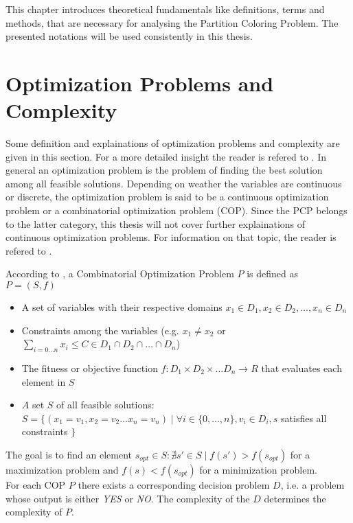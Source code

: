 
This chapter introduces theoretical fundamentals like definitions, terms and methods, that are necessary for analysing the Partition Coloring Problem. The presented notations will be used consistently in this thesis. 

\section{Optimization Problems and Complexity}
Some definition and explainations of optimization problems and complexity are given in this section. For a more detailed insight the reader is refered to \cite{lawler-01,papadimitriou-94,garey-79}. In general an optimization problem is the problem of finding the best solution among all feasible solutions. Depending on weather the variables are continuous or discrete, the optimization problem is said to be a continuous optimization problem or a combinatorial optimization problem (COP). Since the PCP belongs to the latter category, this thesis will not cover further explainations of continuous optimization problems. For information on that topic, the reader is refered to \cite{pardalos-02}.

\begin{definition}
According to \cite{gebhard-12}, a Combinatorial Optimization Problem $P$ is defined as $P = (S, f)$
\begin{itemize}
\item A set of variables with their respective domains $x_1 \in D_1, x_2\in D_2,\ldots, x_n \in D_n$
\item Constraints among the variables (e.g. $x_1 \neq x_2$ or $\sum_{ i=0 \ldots n } x_i \leq C \in D_1 \cap D_2 \cap \ldots \cap D_n$)
\item The fitness or objective function $f : D_1 \times D_2 \times \ldots D_n \rightarrow R$ that evaluates each element in $S$
\item $A$ set $S$ of all feasible solutions: $S = \{(x_1=v_1,x_2=v_2\ldots x_n=v_n) \mid \forall i \in \{0,\ldots,n\},v_i\in D_i,s$ satisfies all constraints $\}$
\end{itemize}
\end{definition}

The goal is to find an element $s_{opt} \in S : \nexists s' \in S \mid f(s') > f (s_{opt})$ for a maximization problem and $f(s) < f(s_{opt})$ for a minimization problem.\\

For each COP $P$ there exists a corresponding decision problem $D$, i.e. a problem whose output is either \textit{YES} or \textit{NO}. The complexity of the $D$ determines the complexity of $P$.

